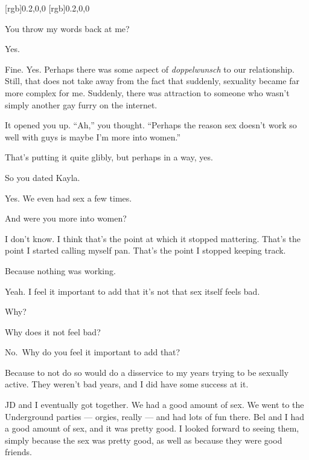 [rgb]{0.2,0,0}
[rgb]{0.2,0,0}
\begin{paracol}{2}
  \begin{rightcolumn*}
    
  \end{rightcolumn*}
  \begin{leftcolumn}
\noindent You throw my words back at me?


\begin{ally}
Yes.
\end{ally}
Fine. Yes. Perhaps there was some aspect of \emph{doppelwunsch} to our relationship. Still, that does not take away from the fact that suddenly, sexuality became far more complex for me. Suddenly, there was attraction to someone who wasn't simply another gay furry on the internet.

\begin{ally}
It opened you up. ``Ah,'' you thought. ``Perhaps the reason sex doesn't work so well with guys is maybe I'm more into women.''
\end{ally}
That's putting it quite glibly, but perhaps in a way, yes.

\begin{ally}
So you dated Kayla.
\end{ally}
Yes. We even had sex a few times.

\begin{ally}
And were you more into women?
\end{ally}
I don't know. I think that's the point at which it stopped mattering. That's the point I started calling myself pan. That's the point I stopped keeping track.

\begin{ally}
Because nothing was working.
\end{ally}
Yeah.
\newpage
\noindent I feel it important to add that it's not that sex itself feels bad.

\begin{ally}
Why?
\end{ally}
Why does it not feel bad?

\begin{ally}
No.~Why do you feel it important to add that?
\end{ally}
Because to not do so would do a disservice to my years trying to be sexually active. They weren't bad years, and I did have some success at it.

JD and I eventually got together. We had a good amount of sex. We went to the Underground parties --- orgies, really --- and had lots of fun there. Bel and I had a good amount of sex, and it was pretty good. I looked forward to seeing them, simply because the sex was pretty good, as well as because they were good friends.


\end{leftcolumn}
\end{paracol}
